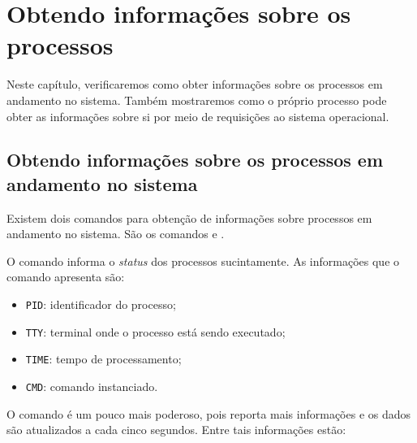 \chapter{Obtendo informações sobre os processos}
Neste capítulo, verificaremos como obter informações sobre os processos em andamento no sistema. Também mostraremos como o próprio processo pode obter as informações sobre si por meio de requisições ao sistema operacional.

\section{Obtendo informações sobre os processos em andamento no sistema}
Existem dois comandos para obtenção de informações sobre processos em andamento no sistema. São os comandos  e .

O comando  informa o \textit{status} dos processos sucintamente. As informações que o comando  apresenta são:

\begin{itemize}
\setlength{\itemsep}{1pt}\setlength{\parskip}{0pt}  \setlength{\parsep}{0pt}
\item \texttt{PID}: identificador do processo;
\item \texttt{TTY}: terminal onde o processo está sendo executado;
\item \texttt{TIME}: tempo de processamento;
\item \texttt{CMD}: comando instanciado.
\end{itemize}

O comando  é um pouco mais poderoso, pois reporta mais informações e os dados são atualizados a cada cinco segundos.  Entre tais informações estão:

